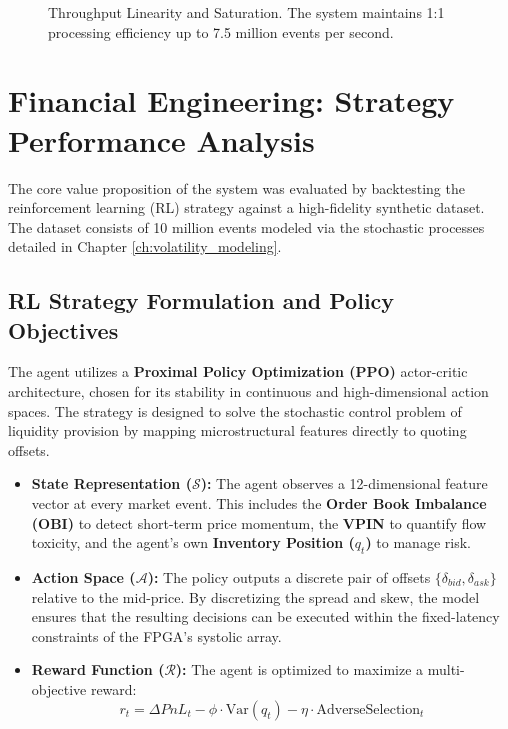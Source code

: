 \begin{figure}
    \centering
    
    \caption{Throughput Linearity and Saturation. The system maintains 1:1 processing efficiency up to 7.5 million events per second.}
    \label{fig:throughput_comparison}
\end{figure}
\clearpage


\section{Financial Engineering: Strategy Performance Analysis}
The core value proposition of the system was evaluated by backtesting the reinforcement learning (RL) strategy against a high-fidelity synthetic dataset. The dataset consists of 10 million events modeled via the stochastic processes detailed in Chapter \ref{ch:volatility_modeling}.

\subsection{RL Strategy Formulation and Policy Objectives}
The agent utilizes a \textbf{Proximal Policy Optimization (PPO)} actor-critic architecture, chosen for its stability in continuous and high-dimensional action spaces. The strategy is designed to solve the stochastic control problem of liquidity provision by mapping microstructural features directly to quoting offsets.

\begin{itemize}
    \item \textbf{State Representation ($\mathcal{S}$):} The agent observes a 12-dimensional feature vector at every market event. This includes the \textbf{Order Book Imbalance (OBI)} to detect short-term price momentum, the \textbf{VPIN} to quantify flow toxicity, and the agent's own \textbf{Inventory Position ($q_t$)} to manage risk.
    \item \textbf{Action Space ($\mathcal{A}$):} The policy outputs a discrete pair of offsets $\{\delta_{bid}, \delta_{ask}\}$ relative to the mid-price. By discretizing the spread and skew, the model ensures that the resulting decisions can be executed within the fixed-latency constraints of the FPGA's systolic array.
    \item \textbf{Reward Function ($\mathcal{R}$):} The agent is optimized to maximize a multi-objective reward:
    \begin{equation}
        r_t = \Delta PnL_t - \phi \cdot \text{Var}(q_t) - \eta \cdot \text{AdverseSelection}_t
    \end{equation}
\end{itemize}

